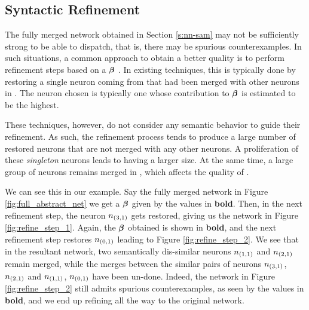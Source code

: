 \subsection{ Syntactic Refinement }

The fully merged network obtained in Section \ref{s:nn-sam} may not be
sufficiently strong to be able to dispatch, that is, there may be 
spurious counterexamples. 
In such situations, a common approach to obtain a better quality \abs is to
perform refinement steps based on a \gencex $\boldsymbol{\beta}$
\cite{cegar-nn,cegarette,cleverest-nn}. 
In existing techniques, this is typically done by restoring a single neuron
coming from \cnc that had been merged with other neurons in \abs. The neuron
chosen is typically one whose contribution to $\boldsymbol{\beta}$ is estimated to be
the highest.

These techniques, however, do not consider any semantic behavior to guide their
refinement. As such, the refinement process tends to produce a large number of
restored neurons that are not merged with any other neurons. A proliferation of
these \emph{singleton} neurons leads to \abs having a larger size. At the same
time, a large group of neurons remains merged in \abs, which affects the quality
of \abs. 

We can see this in our example. Say the fully merged network in Figure
\ref{fig:full_abstract_net} we get a $\boldsymbol{\beta}$ given by the values in \textbf{bold}.
Then, in the next refinement step, the neuron $n_{(3,1)}$ gets restored, giving
us the network in Figure \ref{fig:refine_step_1}. Again, the $\boldsymbol{\beta}$
obtained is shown in \textbf{bold}, and the next refinement step restores $n_{(0,1)}$
leading to Figure \ref{fig:refine_step_2}. We see that in the resultant network,
two semantically dis-similar neurons $n_{(1,1)}$ and $n_{(2,1)}$ remain merged,
while the merges between the similar pairs of neurons $n_{(3,1)}$, $n_{(2,1)}$
and $n_{(1,1)}$, $n_{(0,1)}$ have been un-done. Indeed, the network in Figure
\ref{fig:refine_step_2} still admits spurious counterexamples, as seen by the
values in \textbf{bold}, and we end up refining all the way to the original
network.



